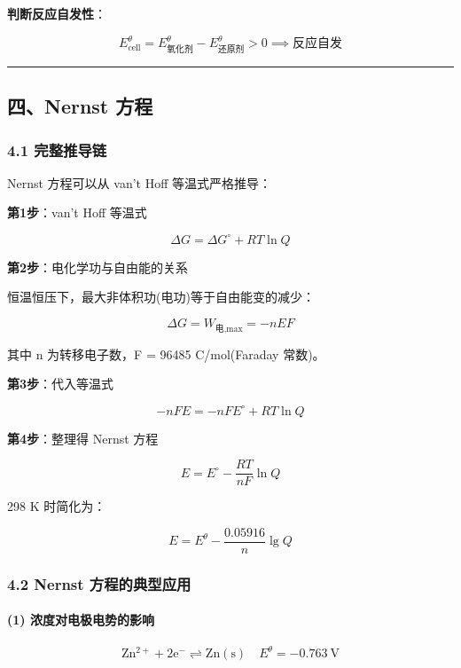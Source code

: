 \documentclass[a4paper,11pt]{ctexart}
\begin{document}
\textbf{判断反应自发性}：

\[
E_{\text{cell}}^\theta = E^\theta_{\text{氧化剂}} - E^\theta_{\text{还原剂}} > 0 \implies \text{反应自发}
\]

\begin{center}\rule{0.5\linewidth}{0.5pt}\end{center}

\subsection{四、Nernst 方程}\label{ux56dbnernst-ux65b9ux7a0b}

\subsubsection{4.1 完整推导链}\label{ux5b8cux6574ux63a8ux5bfcux94fe}

Nernst 方程可以从 van't Hoff 等温式严格推导：

\textbf{第1步}：van't Hoff 等温式

\[\Delta G = \Delta G^\circ + RT\ln Q\]

\textbf{第2步}：电化学功与自由能的关系

恒温恒压下，最大非体积功(电功)等于自由能变的减少：

\[\Delta G = W_{\text{电,max}} = -nEF\]

其中 n 为转移电子数，F = 96485 C/mol(Faraday 常数)。

\textbf{第3步}：代入等温式

\[-nFE = -nFE^\circ + RT\ln Q\]

\textbf{第4步}：整理得 Nernst 方程

\[\boxed{E = E^\circ - \frac{RT}{nF}\ln Q}\]

298 K 时简化为：

\[E = E^\theta - \frac{0.05916}{n}\lg Q\]

\subsubsection{4.2 Nernst 方程的典型应用}\label{nernst-ux65b9ux7a0bux7684ux5178ux578bux5e94ux7528}

\paragraph{(1) 浓度对电极电势的影响}\label{ux6d53ux5ea6ux5bf9ux7535ux6781ux7535ux52bfux7684ux5f71ux54cd}

\[
\mathrm{Zn^{2+} + 2e^- \rightleftharpoons Zn(s)} \quad E^\theta = -0.763\ \mathrm{V}
\]
\end{document}
